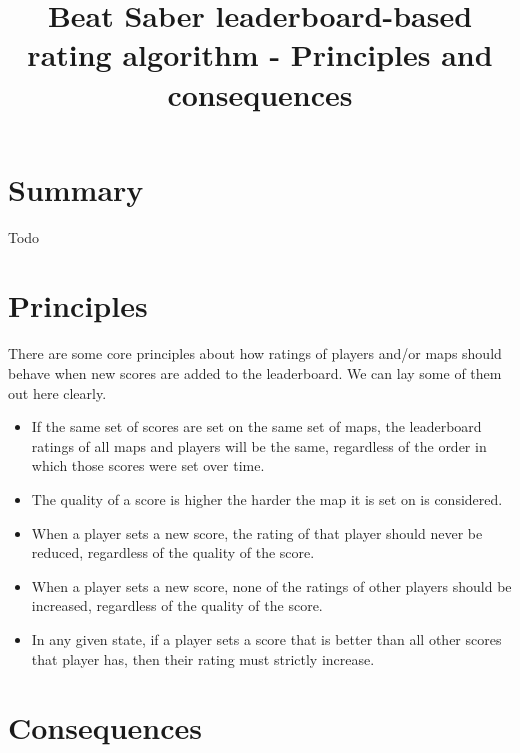 \documentclass[12pt,a4paper]{article}
\title{Beat Saber leaderboard-based rating algorithm - Principles and consequences}
\begin{document}
\maketitle

\section{Summary}

Todo

\section{Principles}

There are some core principles about how ratings of players and/or maps should behave when new scores are added to the leaderboard. We can lay some of them out here clearly.

\begin{itemize}

\item {} If the same set of scores are set on the same set of maps, the leaderboard ratings of all maps and players will be the same, regardless of the order in which those scores were set over time.

\item {} The quality of a score is higher the harder the map it is set on is considered.

\item {} When a player sets a new score, the rating of that player should never be reduced, regardless of the quality of the score.

\item {} When a player sets a new score, none of the ratings of other players should be increased, regardless of the quality of the score.

\item {} In any given state, if a player sets a score that is better than all other scores that player has, then their rating must strictly increase.


\end{itemize}

\section{Consequences}
\end{document}
